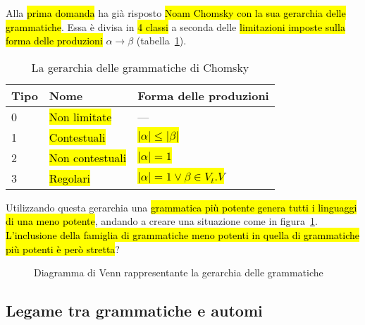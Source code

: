 \documentclass[a4paper,11pt,oneside]{article}
\theoremstyle{plain}
\theoremstyle{definition}
\theoremstyle{remark}
\begin{document}
Alla \hl{prima domanda} ha già risposto \hl{Noam Chomsky con la sua gerarchia
delle grammatiche}. Essa è divisa in \hl{4 classi} a seconda delle
\hl{limitazioni imposte sulla forma delle produzioni} $\alpha \to \beta$
(tabella~\ref{tab:gerarchia-grammatiche}).

\begin{table}[htb]
  \centering
  \begin{tabular}{lll}
    \toprule
    Tipo & Nome            & Forma delle produzioni \\
    \midrule
    0    & \hl{Non limitate}    & --- \\
    1    & \hl{Contestuali}     & \hl{$|\alpha| \leq |\beta|$} \\
    2    & \hl{Non contestuali} & \hl{$|\alpha| = 1$} \\
    3    & \hl{Regolari}        & \hl{$|\alpha| = 1 \vee \beta \in V_t . V$} \\
    \bottomrule
  \end{tabular}
  \caption{La gerarchia delle grammatiche di Chomsky}%
  \label{tab:gerarchia-grammatiche}
\end{table}

Utilizzando questa gerarchia una \hl{grammatica più potente genera tutti i
linguaggi di una meno potente}, andando a creare una situazione come in
figura~\ref{fig:gerarchia-grammatiche}. \hl{L'inclusione della famiglia di
grammatiche meno potenti in quella di grammatiche più potenti è però stretta}?

\begin{figure}[htb]
  \centering
  \caption{Diagramma di Venn rappresentante la gerarchia delle grammatiche}%
  \label{fig:gerarchia-grammatiche}
\end{figure}

\subsection{Legame tra grammatiche e automi}\label{sec:gramamtiche-automi}
\end{document}
